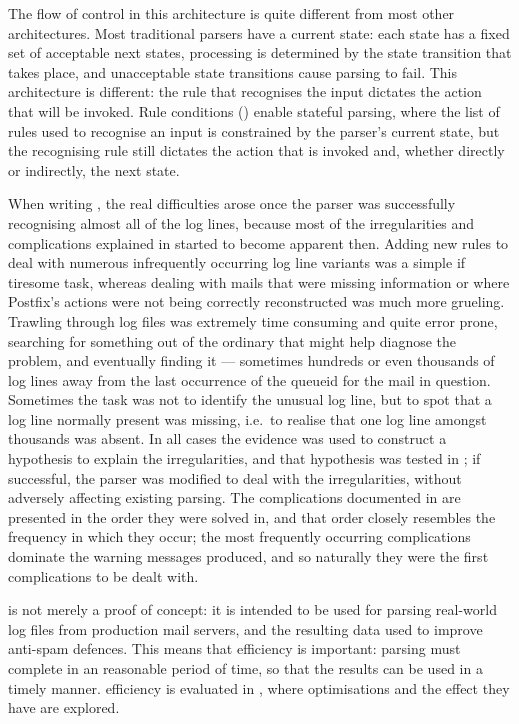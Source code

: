 The flow of control in this architecture is quite different from most other
architectures.  Most traditional parsers have a current state: each state
has a fixed set of acceptable next states, processing is determined by the
state transition that takes place, and unacceptable state transitions cause
parsing to fail.  This architecture is different: the rule that recognises
the input dictates the action that will be invoked.  Rule conditions
() enable stateful parsing,
where the list of rules used to recognise an input is constrained by the
parser's current state, but the recognising rule still dictates the action
that is invoked and, whether directly or indirectly, the next state.

When writing \parsername{}, the real difficulties arose once the parser was
successfully recognising almost all of the log lines, because most of the
irregularities and complications explained in 
started to become apparent then.  Adding new rules to deal with numerous
infrequently occurring log line variants was a simple if tiresome task,
whereas dealing with mails that were missing information or where Postfix's
actions were not being correctly reconstructed was much more grueling.
Trawling through log files was extremely time consuming and quite error
prone, searching for something out of the ordinary that might help diagnose
the problem, and eventually finding it --- sometimes hundreds or even
thousands of log lines away from the last occurrence of the queueid for the
mail in question.  Sometimes the task was not to identify the unusual log
line, but to spot that a log line normally present was missing, i.e.\ to
realise that one log line amongst thousands was absent.  In all cases the
evidence was used to construct a hypothesis to explain the irregularities,
and that hypothesis was tested in \parsername{}; if successful, the parser
was modified to deal with the irregularities, without adversely affecting
existing parsing.  The complications documented in
 are presented in the order they were solved in,
and that order closely resembles the frequency in which they occur; the
most frequently occurring complications dominate the warning messages
produced, and so naturally they were the first complications to be dealt
with.

\parsername{} is not merely a proof of concept: it is intended to be used
for parsing real-world log files from production mail servers, and the
resulting data used to improve anti-spam defences.  This means that
efficiency is important: parsing must complete in an reasonable period of
time, so that the results can be used in a timely manner.  \parsernames{}
efficiency is evaluated in , where
optimisations and the effect they have are explored.

